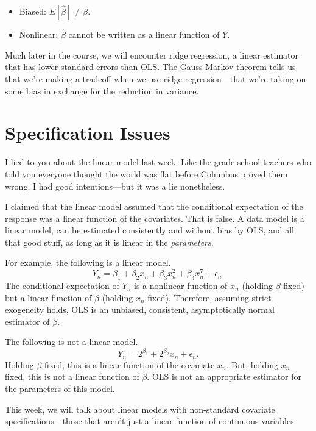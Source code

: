 \documentclass[
  12pt,
  oneside,openany]{book}
\begin{document}
\begin{itemize}
\item
  Biased: \(E[\hat{\beta}] \neq \beta\).
\item
  Nonlinear: \(\hat{\beta}\) cannot be written as a linear function of \(Y\).
\end{itemize}

Much later in the course, we will encounter ridge regression, a linear estimator that has lower standard errors than OLS. The Gauss-Markov theorem tells us that we're making a tradeoff when we use ridge regression---that we're taking on some bias in exchange for the reduction in variance.

\hypertarget{specification}{%
\chapter{Specification Issues}\label{specification}}

\providecommand{\pderiv}{}
\renewcommand{\pderiv}[2]{\frac{\partial{}#1}{\partial{}#2}}

I lied to you about the linear model last week. Like the grade-school teachers who told you everyone thought the world was flat before Columbus proved them wrong, I had good intentions---but it was a lie nonetheless.

I claimed that the linear model assumed that the conditional expectation of the response was a linear function of the covariates. That is false. A data model is a linear model, can be estimated consistently and without bias by OLS, and all that good stuff, as long as it is linear in the \emph{parameters}.

For example, the following is a linear model.
\[
Y_n = \beta_1 + \beta_2 x_n + \beta_3 x_n^2 + \beta_4 x_n^7 + \epsilon_n.
\]
The conditional expectation of \(Y_n\) is a nonlinear function of \(x_n\) (holding \(\beta\) fixed) but a linear function of \(\beta\) (holding \(x_n\) fixed). Therefore, assuming strict exogeneity holds, OLS is an unbiased, consistent, asymptotically normal estimator of \(\beta\).

The following is not a linear model.
\[
Y_n = 2^{\beta_1} + 2^{\beta_2} x_n + \epsilon_n.
\]
Holding \(\beta\) fixed, this is a linear function of the covariate \(x_n\). But, holding \(x_n\) fixed, this is not a linear function of \(\beta\). OLS is not an appropriate estimator for the parameters of this model.

This week, we will talk about linear models with non-standard covariate specifications---those that aren't just a linear function of continuous variables.
\end{document}
